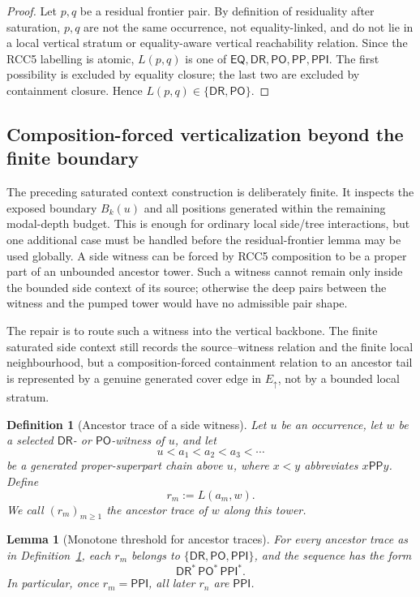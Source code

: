 \documentclass[11pt]{article}
\newtheorem{lemma}[theorem]{Lemma}
\newtheorem{definition}[theorem]{Definition}
\newcommand{\EQ}{\mathsf{EQ}}
\newcommand{\DR}{\mathsf{DR}}
\newcommand{\PO}{\mathsf{PO}}
\newcommand{\PP}{\mathsf{PP}}
\newcommand{\PPI}{\mathsf{PPI}}
\begin{document}
\begin{proof}
Let $p,q$ be a residual frontier pair.  By definition of residuality after saturation, $p,q$ are not the same occurrence, not equality-linked, and do not lie in a local vertical stratum or equality-aware vertical reachability relation.  Since the RCC5 labelling is atomic, $L(p,q)$ is one of $\EQ,\DR,\PO,\PP,\PPI$.  The first possibility is excluded by equality closure; the last two are excluded by containment closure.  Hence $L(p,q)\in\{\DR,\PO\}$.
\end{proof}



\subsection{Composition-forced verticalization beyond the finite boundary}\label{subsec:forced-verticalization}

The preceding saturated context construction is deliberately finite.  It inspects the exposed boundary $B_k(u)$ and all positions generated within the remaining modal-depth budget.  This is enough for ordinary local side/tree interactions, but one additional case must be handled before the residual-frontier lemma may be used globally.  A side witness can be forced by RCC5 composition to be a proper part of an unbounded ancestor tower.  Such a witness cannot remain only inside the bounded side context of its source; otherwise the deep pairs between the witness and the pumped tower would have no admissible pair shape.

The repair is to route such a witness into the vertical backbone.  The finite saturated side context still records the source--witness relation and the finite local neighbourhood, but a composition-forced containment relation to an ancestor tail is represented by a genuine generated cover edge in $E_{\uparrow}$, not by a bounded local stratum.

\begin{definition}[Ancestor trace of a side witness]\label{def:ancestor-trace}
Let $u$ be an occurrence, let $w$ be a selected $\DR$- or $\PO$-witness of $u$, and let
\[
   u < a_1 < a_2 < a_3 < \cdots
\]
be a generated proper-superpart chain above $u$, where $x<y$ abbreviates $x\PP y$.  Define
\[
   r_m := L(a_m,w).
\]
We call $(r_m)_{m\ge 1}$ the ancestor trace of $w$ along this tower.
\end{definition}

\begin{lemma}[Monotone threshold for ancestor traces]\label{lem:monotone-threshold}
For every ancestor trace as in Definition~\ref{def:ancestor-trace}, each $r_m$ belongs to $\{\DR,\PO,\PPI\}$, and the sequence has the form
\[
   \DR^*\,\PO^*\,\PPI^* .
\]
In particular, once $r_m=\PPI$, all later $r_n$ are $\PPI$.
\end{lemma}
\end{document}
